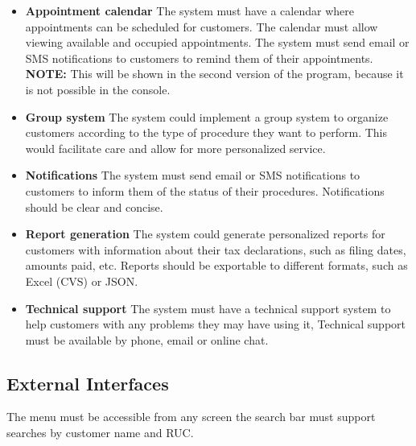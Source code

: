 \documentclass[12pt,a4paper, twosite]{article}
\begin{document}
\begin{itemize}
\item
\textbf {Appointment calendar}
The system must have a calendar where appointments can be scheduled for customers. 
The calendar must allow viewing available and occupied appointments. 
The system must send email or SMS notifications to customers to remind them of their appointments. 
\textbf{NOTE:} 
This will be shown in the second version of the program, because it is not possible in the console. 
\end{itemize}

\begin{itemize}
\item
\textbf {Group system}
The system could implement a group system to organize customers according to the type of procedure they want to perform. 
This would facilitate care and allow for more personalized service. 
\end{itemize}

\begin{itemize}
\item
\textbf {Notifications}
The system must send email or SMS notifications to customers to inform them of the status of their procedures. 
Notifications should be clear and concise. 
\end{itemize}

\begin{itemize}
\item
\textbf {Report generation}
The system could generate personalized reports for customers with information about their tax declarations, such as filing dates, amounts paid, etc. 
Reports should be exportable to different formats, such as Excel (CVS) or JSON. 
\end{itemize}

\begin{itemize}
\item
\textbf {Technical support}
The system must have a technical support system to help customers with any problems they may have using it,
Technical support must be available by phone, email or online chat. 
\end{itemize}






\subsection{External Interfaces}
\label{sec:orgfd5391f}

The menu must be accessible from any screen the search bar must support searches by customer name and RUC.\\
\end{document}
